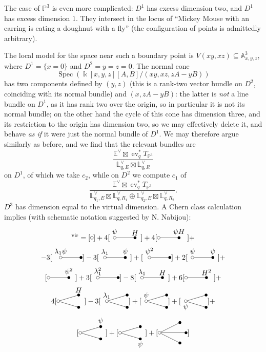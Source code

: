 \documentclass[11pt]{amsart}
\def\reduced{\tikz[baseline=-3pt]{
\draw (0,0) circle[radius=2pt]}
}
\def\Dunouno{\tikz[baseline=-3pt]{
\draw (0,0)node[above]{$\psi$} -- (1,0)node[above]{$H$};
\draw (0,0) circle(2pt)[fill=white];
\fill (1,0) circle (2pt)}
}
\def\Dunodue{\tikz[baseline=-3pt]{
\draw (0,0)-- (1,0)node[above]{$\psi H$};
\draw (0,0) circle(2pt)[fill=white];
\fill (1,0) circle (2pt)}
}
\def\Dunotre{\tikz[baseline=-3pt]{
\draw (0,0)node[above]{$\lambda_1\psi$} -- (1,0);
\draw (0,0) circle(2pt)[fill=white];
\fill (1,0) circle (2pt)}
}
\def\Dunoquat{\tikz[baseline=-3pt]{
\draw (0,0)node[above]{$\lambda_1$} -- (1,0)node[above]{$\psi$};
\draw (0,0) circle(2pt)[fill=white];
\fill (1,0) circle (2pt)}
}
\def\Dunocin{\tikz[baseline=-3pt]{
\draw (0,0)node[above]{$\psi^2$} -- (1,0);
\draw (0,0) circle(2pt)[fill=white];
\fill (1,0) circle (2pt)}
}
\def\Dunosei{\tikz[baseline=-3pt]{
\draw (0,0)node[above]{$\psi$} -- (1,0)node[above]{$\psi$};
\draw (0,0) circle(2pt)[fill=white];
\fill (1,0) circle (2pt)}
}
\def\Dunoset{\tikz[baseline=-3pt]{
\draw (0,0) -- (1,0)node[above]{$\psi^2$};
\draw (0,0) circle(2pt)[fill=white];
\fill (1,0) circle (2pt)}
}
\def\Dunoott{\tikz[baseline=-3pt]{
\draw (0,0)node[above]{$\lambda_1^2$} -- (1,0);
\draw (0,0) circle(2pt)[fill=white];
\fill (1,0) circle (2pt)}
}
\def\Dunonov{\tikz[baseline=-3pt]{
\draw (0,0)node[above]{$\lambda_1$} -- (1,0)node[above]{$H$};
\draw (0,0) circle(2pt)[fill=white];
\fill (1,0) circle (2pt)}
}
\def\Dunodiec{\tikz[baseline=-3pt]{
\draw (0,0) -- (1,0)node[above]{$H^2$};
\draw (0,0) circle(2pt)[fill=white];
\fill (1,0) circle (2pt)}
}
\def\Ddueuno{\tikz[baseline=-3pt]{
\draw (0,0) -- (1,.3)node[above]{$H$} (0,0)--(1,-.3);
\draw (0,0) circle(2pt)[fill=white];
\fill (1,.3) circle (2pt) (1,-.3) circle (2pt)}
}
\def\Dduedue{\tikz[baseline=-3pt]{
\draw (0,0)node[above]{$\lambda_1$} -- (1,.3) (0,0)--(1,-.3);
\draw (0,0) circle(2pt)[fill=white];
\fill (1,.3) circle (2pt) (1,-.3) circle (2pt)}
}
\def\Dduetre{\tikz[baseline=-3pt]{
\draw (0,0)node[above]{$\psi$} -- (1,.3) (0,0)--(1,-.3);
\draw (0,0) circle(2pt)[fill=white];
\fill (1,.3) circle (2pt) (1,-.3) circle (2pt)}
}
\def\Dduequat{\tikz[baseline=-3pt]{
\draw (0,0)node[below]{$\psi$} -- (1,.3) (0,0)--(1,-.3);
\draw (0,0) circle(2pt)[fill=white];
\fill (1,.3) circle (2pt) (1,-.3) circle (2pt)}
}
\def\Dduecin{\tikz[baseline=-3pt]{
\draw (0,0) -- (1,.3)node[above]{$\psi$} (0,0)--(1,-.3);
\draw (0,0) circle(2pt)[fill=white];
\fill (1,.3) circle (2pt) (1,-.3) circle (2pt)}
}
\def\Dduesei{\tikz[baseline=-3pt]{
\draw (0,0) -- (1,.3) (0,0)--(1,-.3)node[below]{$\psi$};
\draw (0,0) circle(2pt)[fill=white];
\fill (1,.3) circle (2pt) (1,-.3) circle (2pt)}
}
\def\Dtre{\tikz[baseline=-3pt]{
\draw (0,0) -- (1,.5) (0,0)--(1,-.5) (0,0) -- (1.3,0);
\draw (0,0) circle(2pt)[fill=white];
\fill (1,.5) circle (2pt) (1,-.5) circle (2pt) (1.3,0) circle (2pt)}
}
\newcommand{\M}[4]{\overline{\mathcal{M}}_{#1,#2}(#3,#4)}
\newcommand{\PP}{\mathbb P}
\newcommand{\Aaff}{\mathbb{A}}
\newcommand{\kk}{\Bbbk}
\newcommand{\Spec}{\operatorname{Spec}}
\newcommand{\virt}[1]{[#1]^{\mathrm{vir}}}
\newcommand{\ev}{\operatorname{ev}}
\theoremstyle{definition}
\theoremstyle{definition}
\begin{document}
The case of $\PP^3$ is even more complicated: $D^1$ has excess dimension two, and $D^1$ has excess dimension $1$. They intersect in the locus of ``Mickey Mouse with an earring is eating a doughnut with a fly'' (the configuration of points is admittedly arbitrary).
\begin{figure}[h]
\end{figure}
The local model for the space near such a boundary point is $V(xy,xz)\subseteq\Aaff^3_{x,y,z}$, where $D^1=\{x=0\}$ and $D^2={y=z=0}$. The normal cone \[\Spec\left(\kk[x,y,z][A,B]/(xy,xz,zA-yB)\right)\] has two components defined by $(y,z)$ (this is a rank-two vector bundle on $D^2$, coinciding with its normal bundle) and $(x,zA-yB)$: the latter is \emph{not} a line bundle on $D^1$, as it has rank two over the origin, so in particular it is not its normal bundle; on the other hand the cycle of this cone has dimension three, and its restriction to the origin has dimension two, so we may effectively delete it, and behave \emph{as if} it were just the normal bundle of $D^1$. We may therefore argue similarly as before, and we find that the relevant bundles are \[\frac{\mathbb E^\vee\boxtimes \ev_q^*T_{\PP^3}}{\mathbb L^\vee_{q,E}\boxtimes \mathbb L^\vee_{q,R}}\]
on $D^1$, of which we take $c_2$, while on $D^2$ we compute $c_1$ of \[\frac{\mathbb E^\vee\boxtimes \ev_q^*T_{\PP^3}}{\mathbb L^\vee_{q_1,E}\boxtimes \mathbb L^\vee_{q,R_1}\oplus\mathbb L^\vee_{q_2,E}\boxtimes \mathbb L^\vee_{q,R_2}}.\]
$D^3$ has dimension equal to the virtual dimension. A Chern class calculation implies (with schematic notation suggested by N. Nabijou):
\begin{multline*}
 \virt{\M{1}{n}{\PP^3}{d}}=[\reduced]+ 4[\Dunouno]+4[\Dunodue]+\\
 -3[\Dunotre]-3[\Dunoquat]+[\Dunocin]+2[\Dunosei]+\\
 [\Dunoset]+3[\Dunoott]-8[\Dunonov]+6[\Dunodiec]+\\
 4[\Ddueuno]-3[\Dduedue]+[\Dduetre]+[\Dduequat]+\\
 [\Dduecin]+[\Dduesei]+[\Dtre]
\end{multline*}
\end{document}

